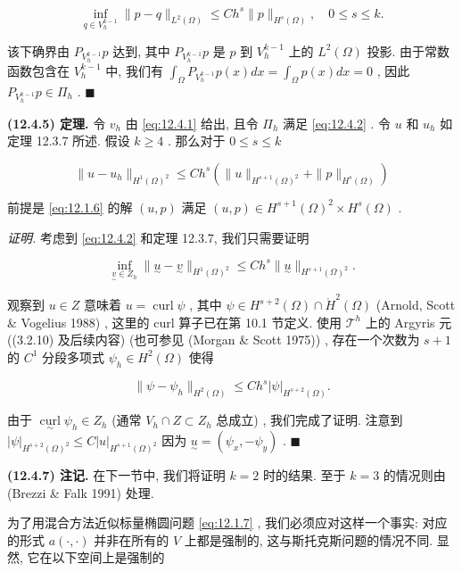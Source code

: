 $$
\inf_{q \in V_{h}^{k - 1}} \|p - q\|_{L^{2}(\Omega)} \leq C h^{s} \|p\|_{H^{s}(\Omega)}, \quad 0 \leq s \leq k.
$$

该下确界由 $P_{V_{h}^{k - 1}}p$ 达到, 其中 $P_{V_{h}^{k - 1}}p$ 是 $p$ 到 $V_{h}^{k - 1}$ 上的 $L^{2}(\Omega)$ 投影. 由于常数函数包含在 $V_{h}^{k - 1}$ 中, 我们有 $\int_{\Omega} P_{V_{h}^{k - 1}}p(x) dx = \int_{\Omega} p(x) dx = 0$ , 因此 $P_{V_{h}^{k - 1}}p \in \varPi_{h}$ . $\blacksquare$

\textbf{(12.4.5) 定理.} 令 $v_{h}$ 由 \eqref{eq:12.4.1} 给出, 且令 $\varPi_{h}$ 满足 \eqref{eq:12.4.2} . 令 $u$ 和 $u_{h}$ 如定理 12.3.7 所述. 假设 $k \geq 4$ . 那么对于 $0 \leq s \leq k$ 

\begin{equation}
\|u - u_{h}\|_{H^{1}(\Omega)^{2}} \leq C h^{s} \left( \|u\|_{H^{s + 1}(\Omega)^{2}} + \|p\|_{H^{s}(\Omega)} \right)
\end{equation}

前提是 \eqref{eq:12.1.6} 的解 $(u,p)$ 满足 $(u,p) \in H^{s + 1}(\Omega)^{2} \times H^{s}(\Omega)$ .

\textit{证明.} 考虑到 \eqref{eq:12.4.2} 和定理 12.3.7, 我们只需要证明

\begin{equation}\label{eq:12.4.6}
\inf_{\underset{\sim}{v} \in Z_{h}} \|\underset{\sim}{u} - \underset{\sim}{v}\|_{H^{1}(\Omega)^{2}} \leq C h^{s} \|\underset{\sim}{u}\|_{H^{s + 1}(\Omega)^{2}}.
\end{equation}

观察到 $u \in Z$ 意味着 $u = \operatorname{curl}\psi$ , 其中 $\psi \in H^{s + 2}(\Omega) \cap \mathring{H}^{2}(\Omega)$ (Arnold, Scott \& Vogelius 1988) , 这里的 curl 算子已在第 10.1 节定义. 使用 $\mathcal{T}^{h}$ 上的 Argyris 元 ((3.2.10) 及后续内容) (也可参见 (Morgan \& Scott 1975)) , 存在一个次数为 $s + 1$ 的 $C^{1}$ 分段多项式 $\psi_{h} \in H^{2}(\Omega)$ 使得

$$
\|\psi - \psi_{h}\|_{H^{2}(\Omega)} \leq C h^{s} |\psi|_{H^{s + 2}(\Omega)}.
$$

由于 $\mathop{\operatorname{curl}}\limits_{\sim} \psi_{h} \in Z_{h}$ (通常 $V_{h} \cap Z \subset Z_{h}$ 总成立) , 我们完成了证明. 注意到 $|\psi|_{H^{s + 2}(\Omega)^{2}} \leq C |u|_{H^{s + 1}(\Omega)^{2}}$ 因为 $\underset{\sim}{u} = (\psi_{x}, -\psi_{y})$ . $\blacksquare$

\textbf{(12.4.7) 注记.} 在下一节中, 我们将证明 $k = 2$ 时的结果. 至于 $k = 3$ 的情况则由 (Brezzi \& Falk 1991) 处理.

为了用混合方法近似标量椭圆问题 \eqref{eq:12.1.7} , 我们必须应对这样一个事实: 对应的形式 $a(\cdot, \cdot)$ 并非在所有的 $V$ 上都是强制的, 这与斯托克斯问题的情况不同. 显然, 它在以下空间上是强制的

